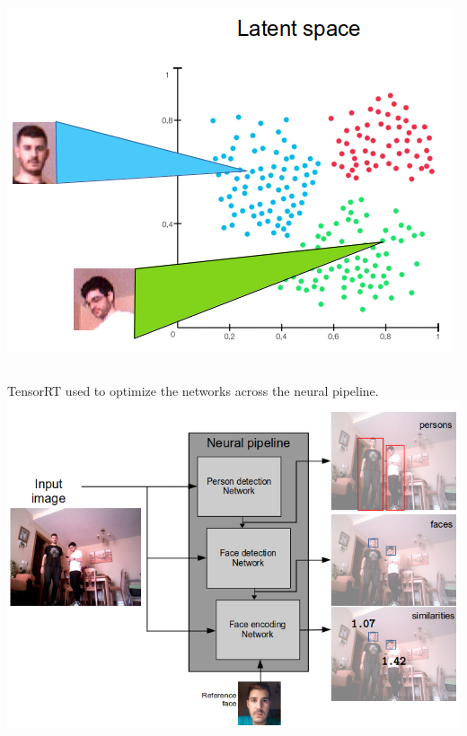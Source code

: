\documentclass[11pt]{beamer}
\begin{document}
\begin{frame}[allowframebreaks]
\begin{columns}
\begin{center}
			\vspace{0.5cm}
			\includegraphics[width=0.6\linewidth]{face_encoder}\\
		\end{center}		
	\end{columns}
	\vspace{8cm}
	TensorRT used to optimize the networks across the neural pipeline.
	\includegraphics[width=0.9\linewidth]{neural_pipeline}
\end{frame}
\end{document}
